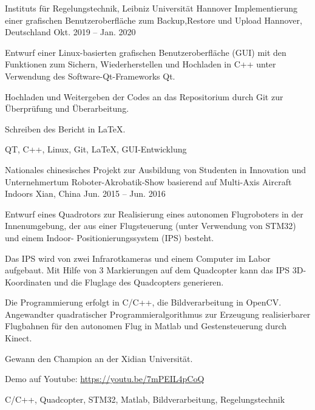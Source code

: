 

\begin{cventries}
\cventry
{Instituts für Regelungstechnik, Leibniz Universität Hannover} %
{Implementierung einer grafischen Benutzeroberfläche zum Backup,Restore und Upload} %
{Hannover, Deutschland} %
{Okt. 2019 – Jan. 2020} %
{
	\begin{cvitems} %
		\item {Entwurf einer Linux-basierten grafischen Benutzeroberfläche (GUI) mit den Funktionen zum Sichern, Wiederherstellen und Hochladen in C++ unter Verwendung des Software-Qt-Frameworks Qt.}
		\item{Hochladen und Weitergeben der Codes an das Repositorium durch Git zur Überprüfung und Überarbeitung.}
		\item {Schreiben des Bericht in LaTeX.}
	\end{cvitems}
	}
{QT, C++, Linux, Git, \LaTeX, GUI-Entwicklung}

  \cventry
    {Nationales chinesisches Projekt zur Ausbildung von Studenten in Innovation und Unternehmertum} 
    {Roboter-Akrobatik-Show basierend auf Multi-Axis Aircraft Indoors}
    {Xian, China} %
    {Jun. 2015 – Jun. 2016} %
    {
      \begin{cvitems} %
        \item {Entwurf eines Quadrotors zur Realisierung eines autonomen Flugroboters in der Innenumgebung, der aus einer Flugsteuerung (unter Verwendung von STM32) und einem Indoor- Positionierungssystem (IPS) besteht.}
        \item {Das IPS wird von zwei Infrarotkameras und einem Computer im Labor aufgebaut. Mit Hilfe von 3 Markierungen auf dem Quadcopter kann das IPS 3D-Koordinaten und die Fluglage des Quadcopters generieren.}
        \item {Die Programmierung erfolgt in C/C++, die Bildverarbeitung in OpenCV. Angewandter quadratischer Programmieralgorithmus zur Erzeugung realisierbarer Flugbahnen für den autonomen Flug in Matlab und Gestensteuerung durch Kinect.}
        \item {Gewann den Champion an der Xidian Universität.}
        \item {Demo auf Youtube:  \url{https://youtu.be/7mPEIL4pCoQ}}
      \end{cvitems}
    }
	{C/C++,  Quadcopter, STM32, Matlab, Bildverarbeitung, Regelungstechnik }	


\end{cventries}
